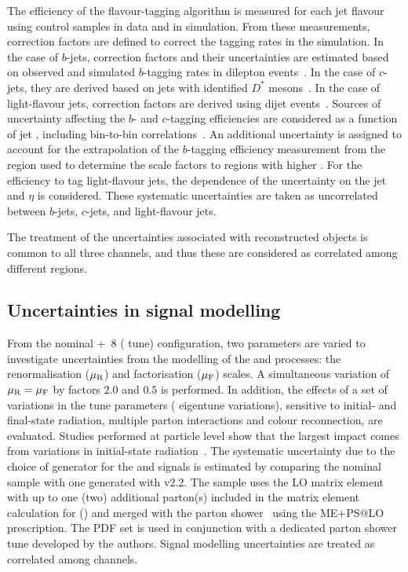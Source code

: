 The efficiency of the flavour-tagging algorithm is measured for each jet
flavour using control samples in data and in simulation. From these
measurements, correction factors are defined to correct the tagging rates in
the simulation.  In the case of $b$-jets, correction factors and their
uncertainties are estimated based on observed and simulated $b$-tagging rates
in \ttbar dilepton events~\cite{ATLAS-CONF-2014-004}.  In the case of $c$-jets,
they are derived based on jets with identified $D^{*}$
mesons~\cite{ATLAS-CONF-2014-046}.  In the case of light-flavour jets,
correction factors are derived using dijet events~\cite{ATLAS-CONF-2014-046}.
Sources of uncertainty affecting the $b$- and $c$-tagging efficiencies are
considered as a function of jet \pt, including bin-to-bin
correlations~\cite{ATLAS-CONF-2014-004}.  An additional uncertainty is assigned
to account for the extrapolation of the $b$-tagging efficiency measurement from
the \pT region used to determine the scale factors to regions with higher \pT.
For the efficiency to tag light-flavour jets, the dependence of the uncertainty on the jet \pt and $\eta$ is considered.  These systematic uncertainties are taken as
uncorrelated between $b$-jets, $c$-jets, and light-flavour jets. 

The treatment of the uncertainties associated with reconstructed objects is common to all
three channels, and thus these are considered as correlated among different
regions.

\subsection{Uncertainties in signal modelling} 
\label{sec:signal_modeling}

From the nominal \MGAMC+\PYTHIA~8 ( tune) configuration, two
parameters are varied to investigate uncertainties from the modelling of the
\ttZ and \ttW processes: the renormalisation ($\mu_{\rm R}$) and factorisation ($\mu_{\rm F}$) scales.
A simultaneous variation of $\mu_{\rm R} = \mu_{\rm F}$ by factors $2.0$ and $0.5$ is performed.  In addition, the effects of a set of variations in the tune parameters
( eigentune variations), sensitive to initial- and final-state
radiation, multiple parton interactions and colour reconnection, are evaluated.
Studies performed at particle level show that the largest impact comes from
variations in initial-state radiation~\cite{ATL-PHYS-PUB-2016-005}.  The
systematic uncertainty due to the choice of generator for the \ttZ and \ttW signals
is estimated by comparing the nominal sample with one generated with \SHERPA
v2.2. The \SHERPA sample uses the LO matrix element with up to one (two) additional parton(s) included
in the matrix element calculation for \ttZ  (\ttW) and merged with the \SHERPA
parton shower~\cite{Schumann:2007mg}  using the \textsc{ME+PS@LO} prescription.
The  PDF set is used in conjunction
with a dedicated parton shower tune developed by the \SHERPA authors.  Signal
modelling uncertainties are treated as correlated among channels.

